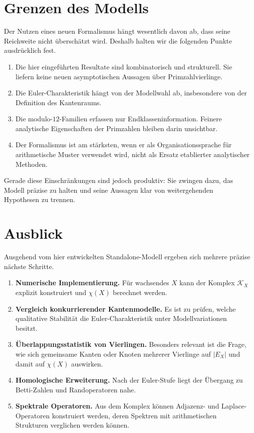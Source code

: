\documentclass[11pt,a4paper]{article}
\theoremstyle{definition}
\theoremstyle{remark}
\newcommand{\EX}{E_X}
\newcommand{\KX}{\mathcal{K}_X}
\newcommand{\ChiX}{\chi(X)}
\begin{document}
	\section{Grenzen des Modells}
	
	Der Nutzen eines neuen Formalismus hängt wesentlich davon ab, dass seine Reichweite nicht überschätzt wird. Deshalb halten wir die folgenden Punkte ausdrücklich fest.
	
	\begin{enumerate}[label=(\arabic*),itemsep=0.25em]
		\item Die hier eingeführten Resultate sind kombinatorisch und strukturell. Sie liefern keine neuen asymptotischen Aussagen über Primzahlvierlinge.
		\item Die Euler-Charakteristik hängt von der Modellwahl ab, insbesondere von der Definition des Kantenraums.
		\item Die modulo-$12$-Familien erfassen nur Endklasseninformation. Feinere analytische Eigenschaften der Primzahlen bleiben darin unsichtbar.
		\item Der Formalismus ist am stärksten, wenn er als Organisationssprache für arithmetische Muster verwendet wird, nicht als Ersatz etablierter analytischer Methoden.
	\end{enumerate}
	
	Gerade diese Einschränkungen sind jedoch produktiv: Sie zwingen dazu, das Modell präzise zu halten und seine Aussagen klar von weitergehenden Hypothesen zu trennen.
	
	\section{Ausblick}
	
	Ausgehend vom hier entwickelten Standalone-Modell ergeben sich mehrere präzise nächste Schritte.
	
	\begin{enumerate}[label=(\arabic*),itemsep=0.25em]
		\item \textbf{Numerische Implementierung.} Für wachsendes $X$ kann der Komplex $\KX$ explizit konstruiert und $\ChiX$ berechnet werden.
		\item \textbf{Vergleich konkurrierender Kantenmodelle.} Es ist zu prüfen, welche qualitative Stabilität die Euler-Charakteristik unter Modellvariationen besitzt.
		\item \textbf{Überlappungsstatistik von Vierlingen.} Besonders relevant ist die Frage, wie sich gemeinsame Kanten oder Knoten mehrerer Vierlinge auf $|\EX|$ und damit auf $\ChiX$ auswirken.
		\item \textbf{Homologische Erweiterung.} Nach der Euler-Stufe liegt der Übergang zu Betti-Zahlen und Randoperatoren nahe.
		\item \textbf{Spektrale Operatoren.} Aus dem Komplex können Adjazenz- und Laplace-Operatoren konstruiert werden, deren Spektren mit arithmetischen Strukturen verglichen werden können.
	\end{enumerate}
	
\end{document}
